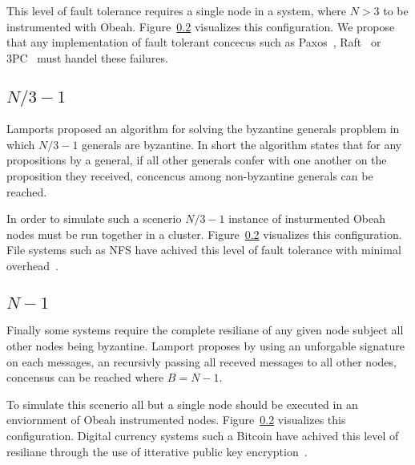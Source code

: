 This level of fault tolerance requires a single node in a system, where $N > 3$
to be instrumented with Obeah. Figure~\ref{} visualizes this configuration. We
propose that any implementation of fault tolerant concecus such as
Paxos~\cite{Lamport2001Paxos}, Raft~\cite{184040} or 3PC~\cite{1703048} must handel these failures.

\subsection{$N/3 -1$}

Lamports proposed an algorithm for solving the byzantine generals propblem in
which $N/3-1$ generals are byzantine. In short the algorithm states that for
any propositions by a general, if all other generals confer with one another on
the proposition they received, concencus among non-byzantine generals can be
reached.

In order to simulate such a scenerio $N/3 - 1$ instance of insturmented Obeah
nodes must be run together in a cluster. Figure~\ref{} visualizes this
configuration. File systems such as NFS have achived this level of fault
tolerance with minimal overhead~\cite{Castro:1999:PBF:296806.296824}.

\subsection{$N-1$}

Finally some systems require the complete resiliane of any given node subject all other nodes being byzantine. Lamport proposes by using an unforgable signature on each messages, an recursivly passing all receved messages to all other nodes, concensus can be reached where $B = N -1$.

To simulate this scenerio all but a single node should be executed in an
enviornment of Obeah instrumented nodes. Figure~\ref{} visualizes this
configuration. Digital currency systems such a Bitcoin have achived this level
of resiliane through the use of itterative public key
encryption~\cite{Nakamoto_bitcoin:a}.
